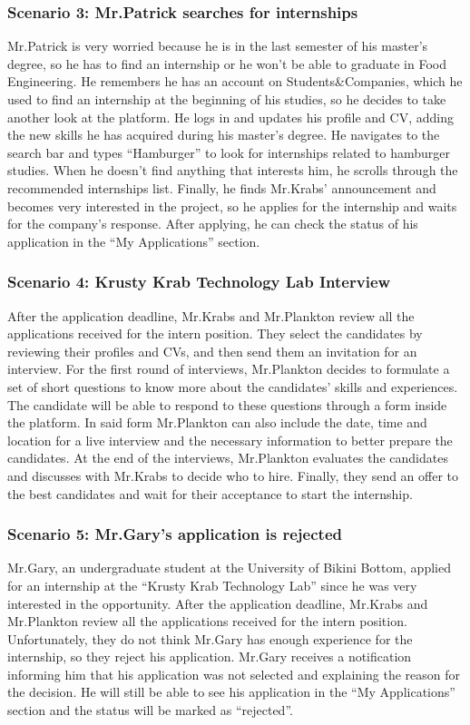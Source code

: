 \subsubsection{Scenario 3: Mr.Patrick searches for internships}\label{subsubsec:scenario_3}
Mr.Patrick is very worried because he is in the last semester of his master's degree, so he has to find an internship or he won't be able to graduate 
in Food Engineering.
He remembers he has an account on Students\&Companies, which he used to find an internship at the beginning of his studies, so he decides 
to take another look at the platform. He logs in and updates his profile and CV, adding the new skills he has acquired during his master’s degree.
He navigates to the search bar and types ``Hamburger'' to look for internships related to hamburger studies. When he doesn’t find anything that 
interests him, he scrolls through the recommended internships list. Finally, he finds Mr.Krabs' announcement and becomes very interested in the 
project, so he applies for the internship and waits for the company's response. After applying, he can check the status of his application in 
the ``My Applications'' section.

\subsubsection{Scenario 4: Krusty Krab Technology Lab Interview}\label{subsubsec:scenario_4}
After the application deadline, Mr.Krabs and Mr.Plankton review all the applications received for the intern position. They select the
candidates by reviewing their profiles and CVs, and then send them an invitation for an interview. For the first round of interviews, Mr.Plankton
decides to formulate a set of short questions to know more about the candidates' skills and experiences. The candidate will be able to respond to 
these questions through a form inside the platform. In said form Mr.Plankton can also include the date, time and location for a live interview and the 
necessary information to better prepare the candidates. At the end of the interviews, Mr.Plankton evaluates the candidates and discusses with Mr.Krabs 
to decide who to hire. Finally, they send an offer to the best candidates and wait for their acceptance to start the internship.

\subsubsection{Scenario 5: Mr.Gary's application is rejected}\label{subsubsec:scenario_5}
Mr.Gary, an undergraduate student at the University of Bikini Bottom, applied for an internship at the ``Krusty Krab Technology Lab'' since he was very 
interested in the opportunity. After the application deadline, Mr.Krabs and Mr.Plankton review all the applications received for the intern 
position. Unfortunately, they do not think Mr.Gary has enough experience for the internship, so they reject his application. Mr.Gary receives a 
notification informing him that his application was not selected and explaining the reason for the decision. He will still be able to see his application 
in the ``My Applications'' section and the status will be marked as ``rejected''.

